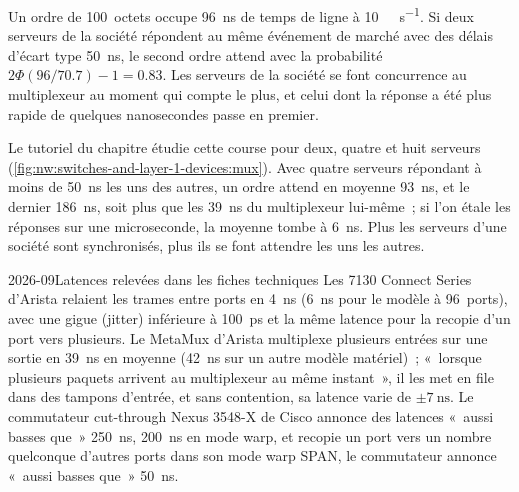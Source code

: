 \begin{example}\label{ex:nw:switches-and-layer-1-devices:two}
Un ordre de 100~octets occupe \qty{96}{\nano\second} de temps de ligne à \qty{10}{\giga\bit\per\second}. Si deux serveurs de la société
répondent au même événement de marché avec des délais d'écart type \qty{50}{\nano\second}, le second ordre attend avec la probabilité
$2\Phi(96/70.7) - 1 = 0.83$. Les serveurs de la société se font concurrence au multiplexeur au moment qui compte
le plus, et celui dont la réponse a été plus rapide de quelques nanosecondes passe en premier.
\end{example}

Le tutoriel du chapitre étudie cette course pour deux, quatre et huit serveurs (\cref{fig:nw:switches-and-layer-1-devices:mux}). Avec quatre
serveurs répondant à moins de \qty{50}{\nano\second} les uns des autres, un ordre attend en moyenne \qty{93}{\nano\second}, et le dernier
\qty{186}{\nano\second}, soit plus que les \qty{39}{\nano\second} du multiplexeur lui-même~; si l'on étale les réponses sur une microseconde, la moyenne
tombe à \qty{6}{\nano\second}. Plus les serveurs d'une société sont synchronisés, plus ils se font attendre les uns les autres.

\begin{dated}{2026-09}{Latences relevées dans les fiches techniques}\label{dat:nw:switches-and-layer-1-devices:devices}
Les  7130 Connect Series d'Arista relaient les trames entre ports en \qty{4}{\nano\second} (\qty{6}{\nano\second} pour le
modèle à 96~ports), avec une gigue (jitter) inférieure à \qty{100}{\pico\second} et la même latence pour la recopie d'un port vers plusieurs. Le MetaMux d'Arista
multiplexe plusieurs entrées sur une sortie en \qty{39}{\nano\second} en moyenne (\qty{42}{\nano\second} sur un autre
modèle matériel)~; «~lorsque plusieurs paquets arrivent au multiplexeur au même instant~», il les met en file dans des tampons d'entrée, et sans
contention, sa latence varie de $\pm\qty{7}{\nano\second}$. Le commutateur cut-through Nexus 3548-X de Cisco annonce des latences «~aussi basses que~»
\qty{250}{\nano\second}, \qty{200}{\nano\second} en mode warp, et recopie un port vers un nombre quelconque d'autres ports dans son mode warp SPAN,
le commutateur annonce «~aussi basses que~» \qty{50}{\nano\second}.
\end{dated}

